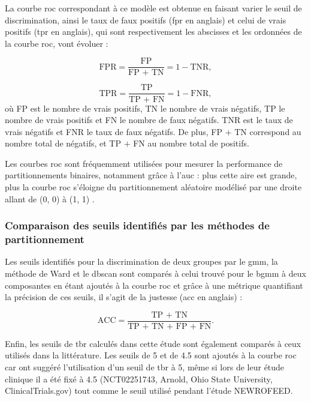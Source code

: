 La courbe \gls{roc} correspondant à ce modèle est obtenue en faisant varier le seuil de discrimination, ainsi le taux de faux positifs (\gls{fpr} en anglais) 
et celui de vrais positifs (\gls{tpr} en anglais), qui sont respectivement les abscisses et les ordonnées de la courbe \gls{roc}, vont évoluer \citep{James2013} : 

\begin{equation}
\label{eq:tbr_fpr_tpr}
\text{FPR} = \frac{\text{FP}}{\text{FP + TN}} = 1 - \text{TNR},
\end{equation}

\begin{equation}
\label{eq:tbr_tpr}
\text{TPR} = \frac{\text{TP}}{\text{TP + FN}} = 1 - \text{FNR},
\end{equation}
où FP est le nombre de vrais positifs, TN le nombre de vrais négatifs, TP le nombre de vrais positifs et FN le nombre de faux négatifs. 
TNR est le taux de vrais négatifs et FNR le taux de faux négatifs.
De plus, FP $+$ TN correspond au nombre total de négatifs, et TP $+$ FN au nombre total de positifs.

Les courbes \gls{roc} sont fréquemment utilisées pour mesurer la performance de partitionnements binaires, notamment grâce à
l'\gls{auc} : plus cette aire est grande, plus la courbe \gls{roc} s'éloigne du partitionnement aléatoire modélisé par une droite allant
de (0, 0) à (1, 1) \citep{James2013}. 

\subsubsection{Comparaison des seuils identifiés par les méthodes de partitionnement}
Les seuils identifiés pour la discrimination de deux groupes par le \gls{gmm}, la méthode de Ward et le \gls{dbscan} sont comparés à celui trouvé pour 
le \gls{bgmm} à deux composantes en étant ajoutés à la courbe \gls{roc} et grâce à une métrique quantifiant la précision de ces seuils, 
il s'agit de la justesse (\gls{acc} en anglais) :

\begin{equation}
\label{eq:tbr_accuracy}
\text{ACC} = \frac{\text{TP + TN}}{\text{TP + TN + FP + FN}}.
\end{equation}

Enfin, les seuils de \gls{tbr} calculés dans cette étude sont également comparés à ceux utilisés dans la littérature. Les seuils de 5 et de 4.5 sont
ajoutés à la courbe \gls{roc} car \citet{Kerson2013} ont suggéré l'utilisation d'un seuil de \gls{tbr} à 5, même si lors de leur étude clinique il a été fixé 
à 4.5 (NCT02251743, Arnold, Ohio State University, ClinicalTrials.gov) tout comme le seuil utilisé pendant l'étude NEWROFEED. 

